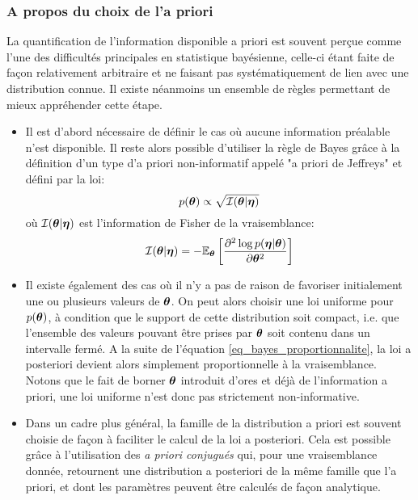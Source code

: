 	\subsubsection{A propos du choix de l'a priori}
	
	La quantification de l'information disponible a priori est souvent perçue comme l'une des difficultés principales en statistique bayésienne, celle-ci étant faite de façon relativement arbitraire et ne faisant pas systématiquement de lien avec une distribution connue. Il existe néanmoins un ensemble de règles permettant de mieux appréhender cette étape.
	
	\begin{itemize}
		\item Il est d'abord nécessaire de définir le cas où aucune information préalable n'est disponible. Il reste alors possible d'utiliser la règle de Bayes grâce à la définition d'un type d'a priori non-informatif appelé "a priori de Jeffreys" et défini par la loi:\\
		\begin{equation}
		p({\bm{\theta}}) \propto \sqrt{\mathcal{I}({\bm{\theta}} | {\bm{\eta}})}
		\label{eq_jeffreys}
		\end{equation}
		où $\mathcal{I}({\bm{\theta}} | {\bm{\eta}})$ est l'information de Fisher de la vraisemblance:
		\begin{equation}
		\mathcal{I}({\bm{\theta}} | {\bm{\eta}}) = -\mathbb{E}_{\bm{\theta}}\left[\dfrac{\partial^2 \log p({\bm{\eta}}|{\bm{\theta}})}{\partial {\bm{\theta}}^2}\right]
		\end{equation}
		
		\item Il existe également des cas où il n'y a pas de raison de favoriser initialement une ou plusieurs valeurs de ${\bm{\theta}}$. On peut alors choisir une loi uniforme pour $p({\bm{\theta}})$, à condition que le support de cette distribution soit compact, i.e. que l'ensemble des valeurs pouvant être prises par ${\bm{\theta}}$ soit contenu dans un intervalle fermé. A la suite de l'équation \eqref{eq_bayes_proportionnalite}, la loi a posteriori devient alors simplement proportionnelle à la vraisemblance. Notons que le fait de borner ${\bm{\theta}}$ introduit d'ores et déjà de l'information a priori, une loi uniforme n'est donc pas strictement non-informative.\\
		
		\item Dans un cadre plus général, la famille de la distribution a priori est souvent choisie de façon à faciliter le calcul de la loi a posteriori. Cela est possible grâce à l'utilisation des \textit{a priori conjugués} qui, pour une vraisemblance donnée, retournent une distribution a posteriori de la même famille que l'a priori, et dont les paramètres peuvent être calculés de façon analytique.\\
	\end{itemize}
	
